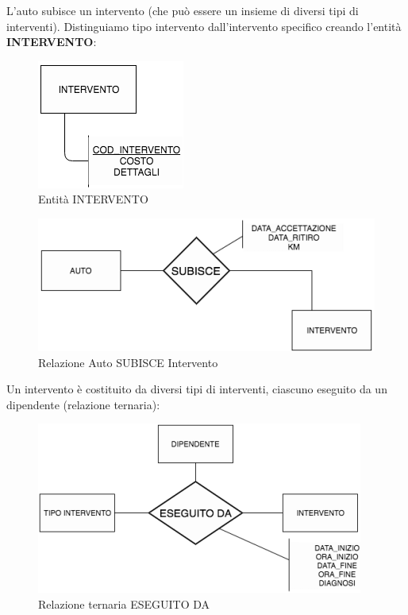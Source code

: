 L’auto subisce un intervento (che può essere un insieme di diversi tipi di interventi). Distinguiamo tipo intervento dall’intervento specifico creando l’entità \textbf{INTERVENTO}:

\begin{center}
\begin{figure}[H]
\centering
\includegraphics[scale=1]{figures/intervento.png}
\caption{Entità INTERVENTO}
\end{figure}
\end{center}

\begin{center}
\begin{figure}[H]
\centering
\includegraphics[scale=1]{figures/auto_subisce_intervento.png}
\caption{Relazione Auto SUBISCE Intervento}
\end{figure}
\end{center}

Un intervento è costituito da diversi tipi di interventi, ciascuno eseguito da un dipendente (relazione ternaria):

\begin{center}
\begin{figure}[H]
\centering
\includegraphics[scale=1]{figures/intervento_eseguitoda.png}
\caption{Relazione ternaria ESEGUITO DA}
\end{figure}
\end{center}

